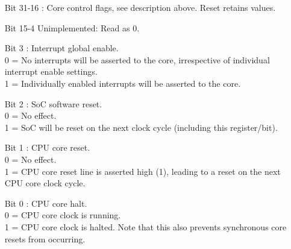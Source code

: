 \vspace{-2mm}
\begin{itemize}[leftmargin=18mm,labelsep=3mm,parsep=1.5mm]
    \item[\footnotesize Bit 31-16] : Core control flags, see description above. Reset retains values.
    \item[\footnotesize Bit 15-4] Unimplemented: Read as 0.
    \item[\footnotesize Bit 3] : Interrupt global enable.\\{\footnotesize
    0 = No interrupts will be asserted to the core, irrespective of individual interrupt enable settings.\\
    1 = Individually enabled interrupts will be asserted to the core.}
    \item[\footnotesize Bit 2] : SoC software reset.\\{\footnotesize
    0 = No effect.\\
    1 = SoC will be reset on the next clock cycle (including this register/bit).}
    \item[\footnotesize Bit 1] : CPU core reset.\\{\footnotesize
    0 = No effect.\\
    1 = CPU core reset line is asserted high (1), leading to a reset on the next CPU core clock cycle.}
    \item[\footnotesize Bit 0] : CPU core halt.\\{\footnotesize
    0 = CPU core clock is running.\\
    1 = CPU core clock is halted. Note that this also prevents synchronous core resets from occurring.}
\end{itemize}

